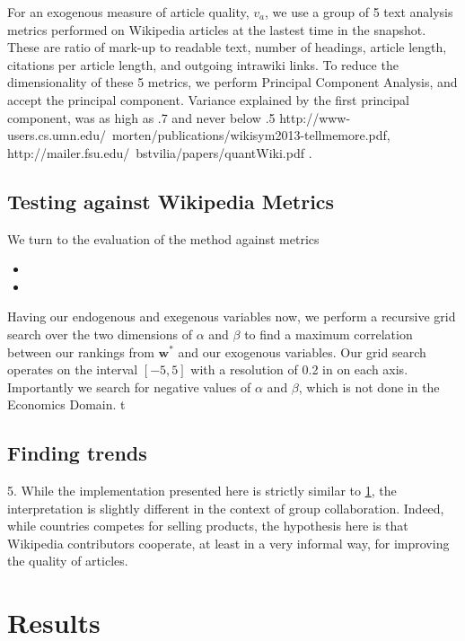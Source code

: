 \documentclass{acm_proc_article-sp}
\begin{document}
For an exogenous measure of article quality, $ v_a$,  we use a group of 5 text analysis metrics performed on Wikipedia articles at the lastest time in the snapshot. These are ratio of mark-up to readable text, number of headings, article length, citations per article length, and outgoing intrawiki links. To reduce the dimensionality of these 5 metrics, we perform Principal Component Analysis, and accept the principal component. Variance explained by the first principal component, was as high as .7 and never below .5 http://www-users.cs.umn.edu/~morten/publications/wikisym2013-tellmemore.pdf, http://mailer.fsu.edu/~bstvilia/papers/quantWiki.pdf \cite{ Morten}.


\subsection{Testing against Wikipedia Metrics}
We turn to the evaluation of the method against metrics 

\begin{itemize}
  \item 
  \item 
\end{itemize}


Having our endogenous and exegenous variables now, we perform a recursive grid search over the two dimensions of $\alpha$ and $\beta$ to find a maximum correlation between our rankings from $\mathbf{w^*}$ and our exogenous variables. Our grid search operates on the interval $[-5,5]$ with a resolution of 0.2 in on each axis. Importantly we search for negative values of $\alpha$ and $\beta$, which is not done in the Economics Domain. t

\subsection{Finding trends}

5. While the implementation presented here is strictly similar to \ref{}, the interpretation is slightly different in the context of group collaboration. Indeed, while countries competes for selling products, the hypothesis here is that Wikipedia contributors cooperate, at least in a very informal way, for improving the quality of articles.

\section{Results}
\end{document}
